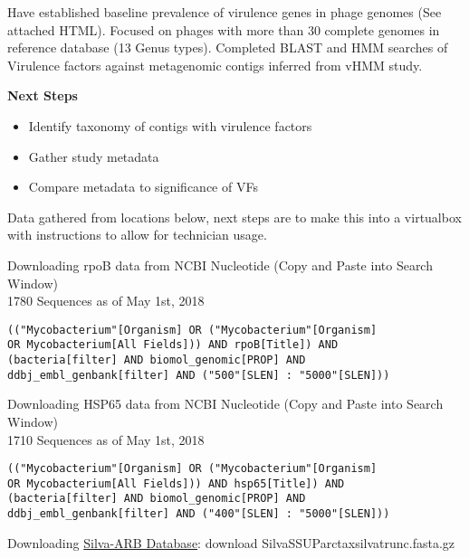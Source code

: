 \documentclass[idxtotoc,hyperref,openany]{labbook} %
\begin{document}

Have established baseline prevalence of virulence genes in phage genomes (See attached HTML). 
Focused on phages with more than 30 complete genomes in reference database (13 Genus types). 
Completed BLAST and HMM searches of Virulence factors against metagenomic contigs inferred from vHMM study. 

\textbf{Next Steps}

\begin{itemize}
\item Identify taxonomy of contigs with virulence factors
\item Gather study metadata
\item Compare metadata to significance of VFs
\end{itemize}




Data gathered from locations below, next steps are to make this into a virtualbox with instructions to allow for technician usage. 

Downloading rpoB data from NCBI Nucleotide (Copy and Paste into Search Window) \\

1780 Sequences as of May 1st, 2018

\begin{verbatim}
(("Mycobacterium"[Organism] OR ("Mycobacterium"[Organism]
OR Mycobacterium[All Fields])) AND rpoB[Title]) AND
(bacteria[filter] AND biomol_genomic[PROP] AND
ddbj_embl_genbank[filter] AND ("500"[SLEN] : "5000"[SLEN]))
\end{verbatim}


Downloading HSP65 data from NCBI Nucleotide (Copy and Paste into Search Window) \\

1710 Sequences as of May 1st, 2018

\begin{verbatim}
(("Mycobacterium"[Organism] OR ("Mycobacterium"[Organism]
OR Mycobacterium[All Fields])) AND hsp65[Title]) AND
(bacteria[filter] AND biomol_genomic[PROP] AND
ddbj_embl_genbank[filter] AND ("400"[SLEN] : "5000"[SLEN]))
\end{verbatim}



Downloading \href{https://www.arb-silva.de/no_cache/download/archive/release_132/Exports/}{Silva-ARB Database}: download SilvaSSUParctaxsilvatrunc.fasta.gz \\
\end{document}
